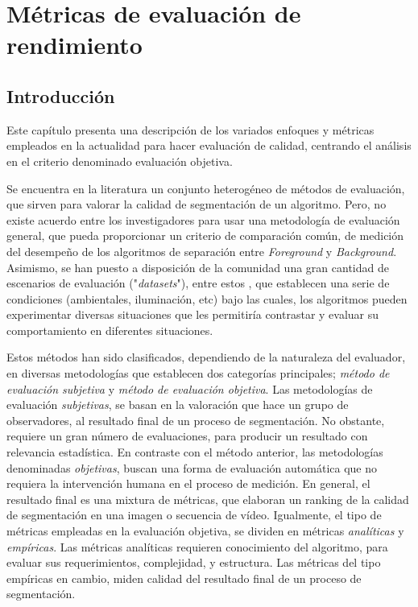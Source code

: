 \chapter{Métricas de evaluación de rendimiento}
 
\section{Introducción}

Este capítulo presenta una descripción de los variados enfoques y métricas empleados en la actualidad para hacer evaluación de calidad, centrando el análisis en el criterio denominado evaluación objetiva.

Se encuentra en la literatura un conjunto heterogéneo de métodos de evaluación, que sirven para valorar la calidad de segmentación de un algoritmo. Pero, no existe acuerdo entre los investigadores para usar una metodología de evaluación general, que pueda proporcionar un criterio de comparación común, de medición del desempeño de los algoritmos de separación entre \emph{Foreground} y \emph{Background}. Asimismo, se han puesto a disposición de la comunidad una gran cantidad de escenarios de evaluación ("\emph{datasets}"), entre estos \cite{singh_muhavi_2010}, que establecen una serie de condiciones (ambientales, iluminación, etc) bajo las cuales, los algoritmos pueden experimentar diversas situaciones que les permitiría contrastar y evaluar su comportamiento en diferentes situaciones.

Estos métodos han sido clasificados, dependiendo de la naturaleza del evaluador, en diversas metodologías que establecen dos categorías principales; \emph{método de evaluación subjetiva} \cite{mckoen_evaluation_2000} y \emph{método de evaluación objetiva}. Las metodologías de evaluación \emph{subjetivas}, se basan en la valoración que hace un grupo de observadores, al resultado final de un proceso de segmentación. No obstante, requiere un gran número de evaluaciones, para producir un resultado con relevancia estadística. En contraste con el método anterior, las metodologías denominadas \emph{objetivas}, buscan una forma de evaluación automática que no requiera la intervención humana en el proceso de medición. En general, el resultado final es una mixtura de métricas, que elaboran un ranking de la calidad de segmentación en una imagen o secuencia de vídeo. Igualmente, el tipo de métricas empleadas en la evaluación objetiva, se dividen en métricas \emph{analíticas} y \emph{empíricas}. Las métricas analíticas requieren conocimiento del algoritmo, para evaluar sus requerimientos,  complejidad,  y estructura. Las métricas del tipo empíricas en cambio, miden calidad del resultado final de un proceso de segmentación.


